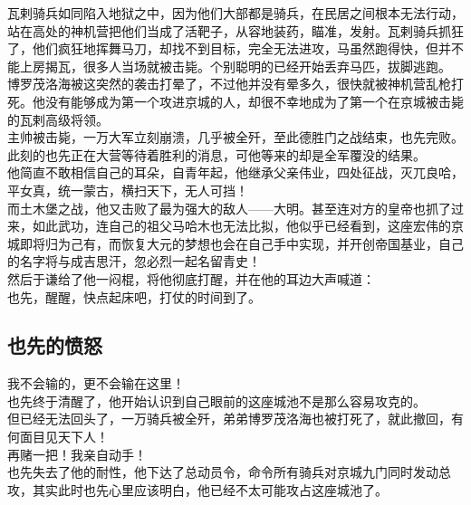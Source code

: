 \begin{multicols}{\theparacolNo}
瓦剌骑兵如同陷入地狱之中，因为他们大部都是骑兵，在民居之间根本无法行动，站在高处的神机营把他们当成了活靶子，从容地装药，瞄准，发射。瓦剌骑兵抓狂了，他们疯狂地挥舞马刀，却找不到目标，完全无法进攻，马虽然跑得快，但并不能上房揭瓦，很多人当场就被击毙。个别聪明的已经开始丢弃马匹，拔脚逃跑。\\

博罗茂洛海被这突然的袭击打晕了，不过他并没有晕多久，很快就被神机营乱枪打死。他没有能够成为第一个攻进京城的人，却很不幸地成为了第一个在京城被击毙的瓦剌高级将领。\\

主帅被击毙，一万大军立刻崩溃，几乎被全歼，至此德胜门之战结束，也先完败。\\

此刻的也先正在大营等待着胜利的消息，可他等来的却是全军覆没的结果。\\

他简直不敢相信自己的耳朵，自青年起，他继承父亲伟业，四处征战，灭兀良哈，平女真，统一蒙古，横扫天下，无人可挡！\\

而土木堡之战，他又击败了最为强大的敌人——大明。甚至连对方的皇帝也抓了过来，如此武功，连自己的祖父马哈木也无法比拟，他似乎已经看到，这座宏伟的京城即将归为己有，而恢复大元的梦想也会在自己手中实现，并开创帝国基业，自己的名字将与成吉思汗，忽必烈一起名留青史！\\

然后于谦给了他一闷棍，将他彻底打醒，并在他的耳边大声喊道：\\

也先，醒醒，快点起床吧，打仗的时间到了。\\

\subsection{也先的愤怒}
我不会输的，更不会输在这里！\\

也先终于清醒了，他开始认识到自己眼前的这座城池不是那么容易攻克的。\\

但已经无法回头了，一万骑兵被全歼，弟弟博罗茂洛海也被打死了，就此撤回，有何面目见天下人！\\

再赌一把！我亲自动手！\\

也先失去了他的耐性，他下达了总动员令，命令所有骑兵对京城九门同时发动总攻，其实此时也先心里应该明白，他已经不太可能攻占这座城池了。\\


\end{multicols}
